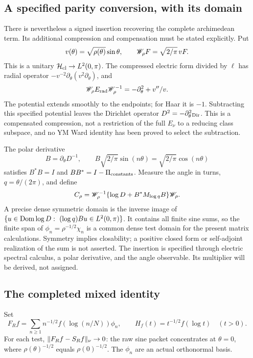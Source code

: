 \subsection{A specified parity conversion, with its domain}
There is nevertheless a signed insertion recovering the complete
archimedean term. Its additional compression and compensation
must be stated explicitly. Put
\begin{equation}
v(\theta)=\sqrt{\rho(\theta)}\sin\theta,\qquad
\mathscr W_\rho F=\sqrt{2/\pi}\,vF .
\end{equation}
This is a unitary $\mathcal H_{\rm cl}\to L^2(0,\pi)$.
The compressed electric form divided by $\ell$ has radial
operator $-v^{-2}\partial_\theta(v^2\partial_\theta)$, and
\begin{equation}
\mathscr W_\rho E_{\rm rad}\mathscr W_\rho^{-1}
=-\partial_\theta^2+v''/v .
\end{equation}
The potential extends smoothly to the endpoints; for Haar it is
$-1$. Subtracting this specified potential leaves the Dirichlet
operator $D^2=-\partial_\theta^2{}_{\rm Dir}$.
This is a compensated compression, not a restriction of the full
$E_\nu$ to a reducing class subspace, and no YM Ward identity
has been proved to select the subtraction.

The polar derivative
\begin{equation}
B=\partial_\theta D^{-1},\qquad
B\sqrt{2/\pi}\sin(n\theta)=\sqrt{2/\pi}\cos(n\theta)
\end{equation}
satisfies $B^*B=I$ and $BB^*=I-\Pi_{\rm constants}$.
Measure the angle in turns, $q=\theta/(2\pi)$, and define
\begin{equation}\label{eq:arch-insertion}
C_\rho=\mathscr W_\rho^{-1}\{\log D+B^*M_{\log q}B\}\mathscr W_\rho .
\end{equation}
A precise dense symmetric domain is the inverse image of
$\{u\in\operatorname{Dom}\log D:\ (\log q)Bu\in L^2(0,\pi)\}$.
It contains all finite sine sums, so the finite span of
$\phi_n=\rho^{-1/2}\chi_n$ is a common dense test domain for
the present matrix calculations. Symmetry implies closability; a positive
closed form or self-adjoint realization of the sum is not asserted.
The insertion is specified through electric spectral calculus,
a polar derivative, and the angle observable. Its multiplier
will be derived, not assigned.

\subsection{The completed mixed identity}
Set
\begin{equation}\label{eq:compensated-packet}
F_Rf=\sum_{n\ge1}n^{-1/2}f(\log(n/N))\phi_n,\qquad
H_f(t)=t^{-1/2}f(\log t)\quad(t>0).
\end{equation}
For each test, $\lVert F_Rf-S_Rf\rVert_\nu\to0$: the raw sine packet
concentrates at $\theta=0$, where $\rho(\theta)^{-1/2}$ equals
$\rho(0)^{-1/2}$. The $\phi_n$ are an actual orthonormal basis.

